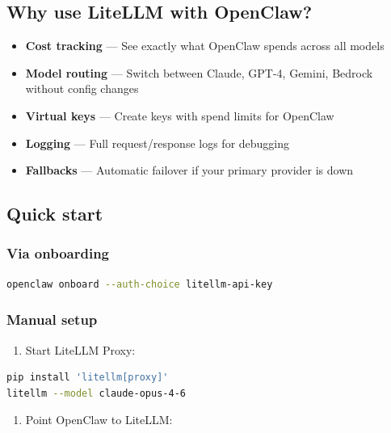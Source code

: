 \subsection{Why use LiteLLM with OpenClaw?}


\begin{itemize}
  \item \textbf{Cost tracking} — See exactly what OpenClaw spends across all models
  \item \textbf{Model routing} — Switch between Claude, GPT-4, Gemini, Bedrock without config changes
  \item \textbf{Virtual keys} — Create keys with spend limits for OpenClaw
  \item \textbf{Logging} — Full request/response logs for debugging
  \item \textbf{Fallbacks} — Automatic failover if your primary provider is down
\end{itemize}


\subsection{Quick start}


\subsubsection{Via onboarding}


\begin{lstlisting}[language=bash]
openclaw onboard --auth-choice litellm-api-key
\end{lstlisting}


\subsubsection{Manual setup}


\begin{enumerate}
  \item Start LiteLLM Proxy:
\end{enumerate}


\begin{lstlisting}[language=bash]
pip install 'litellm[proxy]'
litellm --model claude-opus-4-6
\end{lstlisting}


\begin{enumerate}
  \item Point OpenClaw to LiteLLM:
\end{enumerate}


